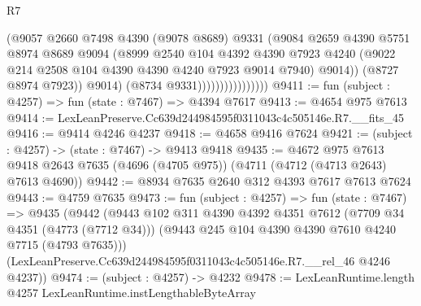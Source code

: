 \begin{lexlean}{R7}
\begin{coremodule}
                                    (@9057
                                      @2660
                                      @7498
                                      @4390
                                      (@9078 @8689)
                                      @9331
                                      (@9084
                                        @2659
                                        @4390
                                        @5751
                                        @8974
                                        @8689
                                        @9094
                                        (@8999
                                          @2540
                                          @104
                                          @4392
                                          @4390
                                          @7923
                                          @4240
                                          (@9022
                                            @214
                                            @2508
                                            @104
                                            @4390
                                            @4390
                                            @4240
                                            @7923
                                            @9014
                                            @7940)
                                          @9014))
                                      (@8727 @8974 @7923))
                                    @9014)
                                  (@8734 @9331))))))))))))))))
@9411 := fun (subject : @4257) => fun (state : @7467) => @4394 @7617
@9413 := @4654 @975 @7613
@9414 := LexLeanPreserve.Cc639d244984595f0311043c4c505146e.R7.__fits_45
@9416 := @9414 @4246 @4237
@9418 := @4658 @9416 @7624
@9421 := (subject : @4257) -> (state : @7467) -> @9413 @9418
@9435 := @4672
    @975
    @7613
    @9418
    @2643
    @7635
    (@4696 (@4705 @975))
    (@4711 (@4712 (@4713 @2643) @7613 @4690))
@9442 := @8934 @7635 @2640 @312 @4393 @7617 @7613 @7624
@9443 := @4759 @7635
@9473 := fun (subject : @4257) =>
  fun (state : @7467) =>
  @9435
    (@9442
      (@9443
        @102
        @311
        @4390
        @4392
        @4351
        @7612
        (@7709 @34 @4351 (@4773 (@7712 @34)))
        (@9443 @245 @104 @4390 @4390 @7610 @4240 @7715 (@4793 @7635)))
      (LexLeanPreserve.Cc639d244984595f0311043c4c505146e.R7.__rel_46 @4246 @4237))
@9474 := (subject : @4257) -> @4232
@9478 := LexLeanRuntime.length @4257 LexLeanRuntime.instLengthableByteArray

\end{coremodule}
\end{lexlean}
